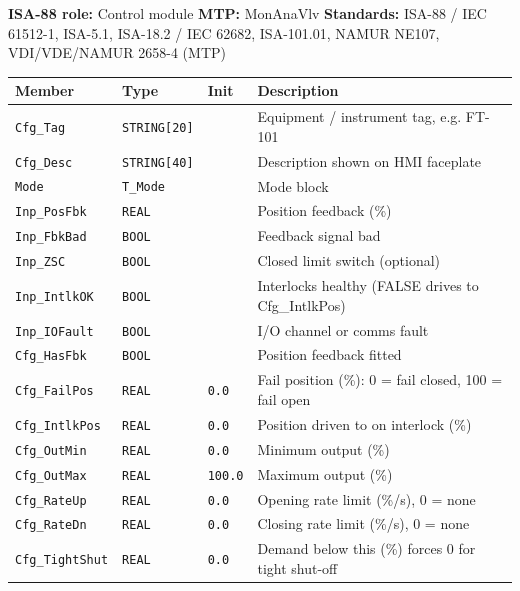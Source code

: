 {\small\textbf{ISA-88 role:} Control module \quad \textbf{MTP:} MonAnaVlv \quad \textbf{Standards:} ISA-88 /\allowbreak{} IEC 61512-1, ISA-5.1, ISA-18.2 /\allowbreak{} IEC 62682, ISA-101.01, NAMUR NE107, VDI/\allowbreak{}VDE/\allowbreak{}NAMUR 2658-4 (MTP)}
{\footnotesize
\begin{longtable}{@{}>{\raggedright\arraybackslash}p{3.4cm}>{\raggedright\arraybackslash}p{3.3cm}>{\raggedright\arraybackslash}p{1.3cm}>{\raggedright\arraybackslash}p{6.4cm}@{}}
\toprule
\rowcolor{tblhead}\textbf{Member} & \textbf{Type} & \textbf{Init} & \textbf{Description} \\
\midrule
\endhead
\texttt{Cfg\_Tag} & \texttt{STRING[20]} &  & Equipment /\allowbreak{} instrument tag, e.g. FT-101 \\
\texttt{Cfg\_Desc} & \texttt{STRING[40]} &  & Description shown on HMI faceplate \\
\texttt{Mode} & \texttt{T\_Mode} &  & Mode block \\
\texttt{Inp\_PosFbk} & \texttt{REAL} &  & Position feedback (\%) \\
\texttt{Inp\_FbkBad} & \texttt{BOOL} &  & Feedback signal bad \\
\texttt{Inp\_ZSC} & \texttt{BOOL} &  & Closed limit switch (optional) \\
\texttt{Inp\_IntlkOK} & \texttt{BOOL} &  & Interlocks healthy (FALSE drives to Cfg\_IntlkPos) \\
\texttt{Inp\_IOFault} & \texttt{BOOL} &  & I/\allowbreak{}O channel or comms fault \\
\texttt{Cfg\_HasFbk} & \texttt{BOOL} &  & Position feedback fitted \\
\texttt{Cfg\_FailPos} & \texttt{REAL} & \texttt{0.0} & Fail position (\%): 0 = fail closed, 100 = fail open \\
\texttt{Cfg\_IntlkPos} & \texttt{REAL} & \texttt{0.0} & Position driven to on interlock (\%) \\
\texttt{Cfg\_OutMin} & \texttt{REAL} & \texttt{0.0} & Minimum output (\%) \\
\texttt{Cfg\_OutMax} & \texttt{REAL} & \texttt{100.0} & Maximum output (\%) \\
\texttt{Cfg\_RateUp} & \texttt{REAL} & \texttt{0.0} & Opening rate limit (\%/\allowbreak{}s), 0 = none \\
\texttt{Cfg\_RateDn} & \texttt{REAL} & \texttt{0.0} & Closing rate limit (\%/\allowbreak{}s), 0 = none \\
\texttt{Cfg\_TightShut} & \texttt{REAL} & \texttt{0.0} & Demand below this (\%) forces 0 for tight shut-off \\

\end{longtable}}
